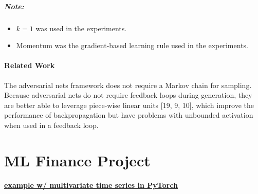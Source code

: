 \paragraph*{Note: }
\begin{itemize}
\item
	$k=1$ was used in the experiments.
\item
	Momentum was the gradient-based learning rule used in the experiments.
\end{itemize}

\subsubsection*{Related Work}

The adversarial nets framework does not require a Markov chain for sampling. Because adversarial nets do not require feedback loops during generation, they are better able to leverage piece-wise linear units [19, 9, 10], which improve the performance of backpropagation but have problems with unbounded activation when used in a feedback loop.

\cite{Sing1503:Comment}




\chapter{ML Finance Project}

\subsubsection*{\href{https://stackabuse.com/time-series-prediction-using-lstm-with-pytorch-in-python/}{example w/ multivariate time series in PyTorch}}


